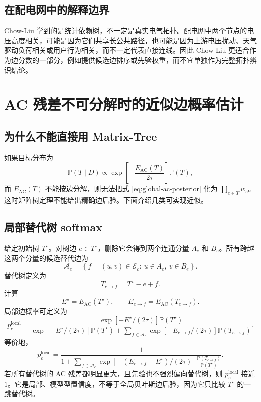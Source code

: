 \documentclass[UTF8,12pt,openany]{ctexrep}
\numberwithin{equation}{chapter}
\theoremstyle{definition}
\theoremstyle{plain}
\newcommand{\Prob}{\mathbb{P}}
\newcommand{\Acal}{\mathcal{A}}
\newcommand{\Eac}{E_{\mathrm{AC}}}
\begin{document}
\section{在配电网中的解释边界}

Chow-Liu 学到的是统计依赖树，不一定是真实电气拓扑。配电网中两个节点的电压高度相关，可能是因为它们共享长公共路径，也可能是因为上游电压扰动、天气驱动负荷相关或用户行为相关，而不一定代表直接连线。因此 Chow-Liu 更适合作为边分数的一部分，例如提供候选边排序或先验权重，而不宜单独作为完整拓扑辨识结论。

\chapter{AC 残差不可分解时的近似边概率估计}

\section{为什么不能直接用 Matrix-Tree}

如果目标分布为
\begin{equation}
\Prob(T\mid D)
\propto
\exp\left[-\frac{\Eac(T)}{2\tau}\right]\Prob(T),
\label{eq:global-ac-posterior}
\end{equation}
而 $\Eac(T)$ 不能按边分解，则无法把式 \eqref{eq:global-ac-posterior} 化为 $\prod_{e\in T}w_e$。这时矩阵树定理不能给出精确边后验。下面介绍几类可实现近似。

\section{局部替代树 softmax}

给定初始树 $T^\star$。对树边 $e\in T^\star$，删除它会得到两个连通分量 $A_e$ 和 $B_e$。所有跨越这两个分量的候选替代边为
\begin{equation}
\Acal_e
=
\left\{f=(u,v)\in\mathcal{E}_c:\ u\in A_e,\ v\in B_e\right\}.
\label{eq:replacement-set}
\end{equation}
替代树定义为
\begin{equation}
T_{e\to f}=T^\star-e+f.
\label{eq:replacement-tree}
\end{equation}
计算
\begin{equation}
E^\star=\Eac(T^\star),
\qquad
E_{e\to f}=\Eac(T_{e\to f}).
\end{equation}
局部边概率可定义为
\begin{equation}
p_e^{\mathrm{local}}
=
\frac{
\exp[-E^\star/(2\tau)]\Prob(T^\star)
}{
\exp[-E^\star/(2\tau)]\Prob(T^\star)
+
\sum_{f\in\Acal_e}
\exp[-E_{e\to f}/(2\tau)]\Prob(T_{e\to f})
}.
\label{eq:local-softmax}
\end{equation}
等价地，
\begin{equation}
p_e^{\mathrm{local}}
=
\frac{1}{
1+\sum_{f\in\Acal_e}
\exp[-(E_{e\to f}-E^\star)/(2\tau)]
\frac{\Prob(T_{e\to f})}{\Prob(T^\star)}
}.
\label{eq:local-softmax-ratio}
\end{equation}
若所有替代树的 AC 残差都明显更大，且先验也不强烈偏向替代树，则 $p_e^{\mathrm{local}}$ 接近 $1$。它是局部、模型型置信度，不等于全局贝叶斯边后验，因为它只比较 $T^\star$ 的一跳替代树。
\end{document}

